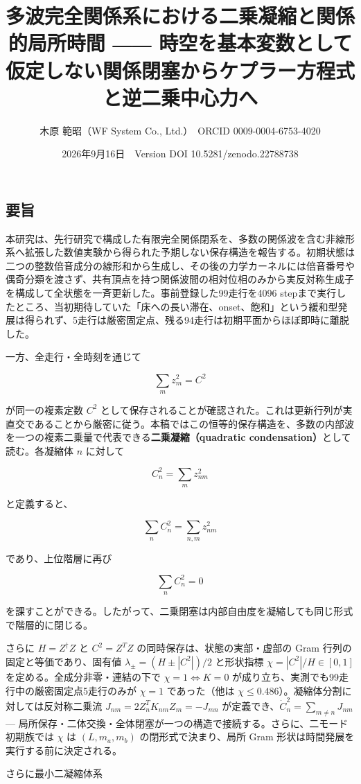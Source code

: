 \documentclass[
  a4paper,
]{ltjsarticle}
\title{多波完全関係系における二乗凝縮と関係的局所時間 ――
時空を基本変数として仮定しない関係閉塞からケプラー方程式と逆二乗中心力へ}
\author{木原 範昭（WF System Co., Ltd.）　ORCID 0009-0004-6753-4020}
\date{2026年9月16日　Version DOI 10.5281/zenodo.22788738}
\begin{document}
\maketitle

\subsection{要旨}\label{ux8981ux65e8}

本研究は、先行研究で構成した有限完全関係閉系を、多数の関係波を含む非線形系へ拡張した数値実験から得られた予期しない保存構造を報告する。初期状態は二つの整数倍音成分の線形和から生成し、その後の力学カーネルには倍音番号や偶奇分類を渡さず、共有頂点を持つ関係波間の相対位相のみから実反対称生成子を構成して全状態を一斉更新した。事前登録した99走行を4096
stepまで実行したところ、当初期待していた「床への長い滞在、onset、飽和」という緩和型発展は得られず、5走行は厳密固定点、残る94走行は初期平面からほぼ即時に離脱した。

一方、全走行・全時刻を通じて

\[
\boxed{\sum_m z_m^2=C^2}
\]

が同一の複素定数 \(C^2\)
として保存されることが確認された。これは更新行列が実直交であることから厳密に従う。本稿ではこの恒等的保存構造を、多数の内部波を一つの複素二乗量で代表できる\textbf{二乗凝縮（quadratic
condensation）}として読む。各凝縮体 \(n\) に対して

\[
C_n^2=\sum_m z_{nm}^2
\]

と定義すると、

\[
\sum_n C_n^2=\sum_{n,m}z_{nm}^2
\]

であり、上位階層に再び

\[
\boxed{\sum_n C_n^2=0}
\]

を課すことができる。したがって、二乗閉塞は内部自由度を凝縮しても同じ形式で階層的に閉じる。

さらに \(H=Z^\dagger Z\) と \(C^2=Z^TZ\)
の同時保存は、状態の実部・虚部の Gram 行列の固定と等価であり、固有値
\(\lambda_\pm=(H\pm|C^2|)/2\) と形状指標 \(\chi=|C^2|/H\in[0,1]\)
を定める。全成分非零・連結の下で \(\chi=1\iff K=0\)
が成り立ち、実測でも99走行中の厳密固定点5走行のみが \(\chi=1\)
であった（他は \(\chi\le0.486\)）。凝縮体分割に対しては反対称二乗流
\(J_{nm}=2Z_n^TK_{nm}Z_m=-J_{mn}\)
が定義でき、\(\dot C_n^2=\sum_{m\ne n}J_{nm}\) ---
局所保存・二体交換・全体閉塞が一つの構造で接続する。さらに、二モード初期族では
\(\chi\) は \((L,m_a,m_b)\) の閉形式で決まり、局所 Gram
形状は時間発展を実行する前に決定される。

さらに最小二凝縮体系
\end{document}
